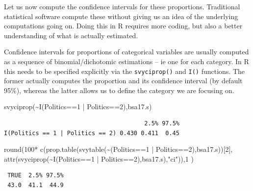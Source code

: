 \documentclass[
  14,
  a4paper,
  DIV=11,
  numbers=noendperiod]{scrartcl}
\newenvironment{Shaded}{\begin{snugshade}}{\end{snugshade}}
\newcommand{\DecValTok}[1]{\textcolor[rgb]{0.68,0.00,0.00}{#1}}
\newcommand{\FunctionTok}[1]{\textcolor[rgb]{0.28,0.35,0.67}{#1}}
\newcommand{\NormalTok}[1]{\textcolor[rgb]{0.00,0.23,0.31}{#1}}
\newcommand{\SpecialCharTok}[1]{\textcolor[rgb]{0.37,0.37,0.37}{#1}}
\newcommand{\StringTok}[1]{\textcolor[rgb]{0.13,0.47,0.30}{#1}}
\begin{document}
Let us now compute the confidence intervals for these proportions.
Traditional statistical software compute these without giving us an idea
of the underlying computations going on. Doing this in R requires more
coding, but also a better understanding of what is actually estimated.

Confidence intervals for proportions of categorical variables are
usually computed as a sequence of binomial/dichotomic estimations -- ie
one for each category. In R this needs to be specified explicitly via
the \texttt{svyciprop()} and \texttt{I()} functions. The former actually
computes the proportion and its confidence interval (by default 95\%),
whereas the latter allows us to define the category we are focusing on.

\begin{Shaded}
\begin{Highlighting}[]
\FunctionTok{svyciprop}\NormalTok{(}\SpecialCharTok{\textasciitilde{}}\FunctionTok{I}\NormalTok{(Politics}\SpecialCharTok{==}\DecValTok{1} \SpecialCharTok{|}\NormalTok{ Politics}\SpecialCharTok{==}\DecValTok{2}\NormalTok{),bsa17.s)}
\end{Highlighting}
\end{Shaded}

\begin{verbatim}
                                        2.5% 97.5%
I(Politics == 1 | Politics == 2) 0.430 0.411  0.45
\end{verbatim}

\begin{Shaded}
\begin{Highlighting}[]
\FunctionTok{round}\NormalTok{(}\DecValTok{100}\SpecialCharTok{*}
        \FunctionTok{c}\NormalTok{(}\FunctionTok{prop.table}\NormalTok{(}\FunctionTok{svytable}\NormalTok{(}\SpecialCharTok{\textasciitilde{}}\NormalTok{(Politics}\SpecialCharTok{==}\DecValTok{1} \SpecialCharTok{|}\NormalTok{ Politics}\SpecialCharTok{==}\DecValTok{2}\NormalTok{),bsa17.s))[}\DecValTok{2}\NormalTok{],}
\FunctionTok{attr}\NormalTok{(}\FunctionTok{svyciprop}\NormalTok{(}\SpecialCharTok{\textasciitilde{}}\FunctionTok{I}\NormalTok{(Politics}\SpecialCharTok{==}\DecValTok{1} \SpecialCharTok{|}\NormalTok{ Politics}\SpecialCharTok{==}\DecValTok{2}\NormalTok{),bsa17.s),}\StringTok{"ci"}\NormalTok{)),}\DecValTok{1}
\NormalTok{)}
\end{Highlighting}
\end{Shaded}

\begin{verbatim}
 TRUE  2.5% 97.5% 
 43.0  41.1  44.9 
\end{verbatim}
\end{document}
